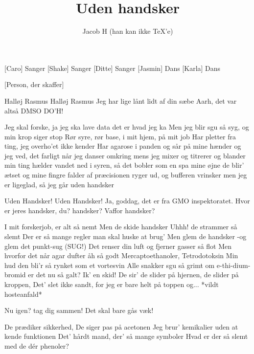 \documentclass[a4paper,11pt]{article}
\title{Uden handsker}
\author{Jacob H (han kan ikke \TeX'e)}
\begin{document}
\maketitle

\begin{roles}
    [Caro] Sanger
    [Shake] Sanger
    [Ditte] Sanger
    [Jasmin] Dans
    [Karla] Dans
\end{roles}

\begin{props}
    [Person, der skaffer]
\end{props}

\begin{song}
   Halløj Rasmus
  Halløj Rasmus
  Jeg har lige lånt lidt af din sæbe
  Aarh, det var altså DMSO
  DO’H!

  Jeg skal forske, ja jeg ska
  lave data det er hvad jeg ka
  Men jeg blir sgu så syg, og min krop siger stop
  Rør syre, rør base, i mit hjem, på mit job
  Har pletter fra ting, jeg overho'et ikke kender
  Har agarose i panden og sår på mine hænder
  og jeg ved, det farligt når jeg danser omkring
  mens jeg mixer og titrerer og blander min ting
  hælder vandet ned i syren, så det bobler som en spa
  mine øjne de blir' ætset og mine fingre falder af
  præcisionen ryger ud, og bufferen vrinsker
  men jeg er ligeglad, så jeg går uden handsker

  Uden Handsker! Uden Handsker!
  Ja, goddag, det er fra GMO inspektoratet. Hvor er jeres handsker, du?
  handsker? Vaffor handsker?

  I mit forskerjob, er alt så nemt
  Men de skide handsker Uhhh! de strammer så slemt
  Der er så mange regler man skal huske at brug'
  Men glem de handsker -og glem det punkt-sug (SUG!)
  Det renser din luft og fjerner gasser så flot
  Men hvorfor det når agar dufter åh så godt
  Mercaptoethanoler, Tetrodotoksin
  Min hud den bli’r så rynket som et vortesvin
  Alle snakker sgu så grimt om e-thi-dium-bromid
  er det nu så galt? Ik' en skid!
  De sir' de slider på hjernen, de slider på kroppen,
  Det’ slet ikke sandt, for jeg er bare helt på toppen og... *vildt hosteanfald*

  Nu igen? tag dig sammen! Det skal bare gås væk!

  De prædiker sikkerhed, De siger pas på acetonen
  Jeg brur' kemikalier uden at kende funktionen
  Det' hårdt mand, der' så mange symboler
  Hvad er der så slemt med de dér phenoler?


\end{song}
\end{document}
